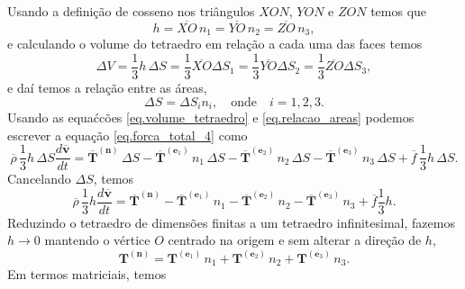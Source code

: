 Usando a defini\c{c}\~ao de cosseno nos tri\^angulos $XON$, $YON$ e $ZON$ temos que
\begin{equation*}
h=\overline{XO}\,n_1=\overline{YO}\,n_2=\overline{ZO}\,n_3,
\end{equation*}
e calculando o volume do tetraedro em rela\c{c}\~ao a cada uma das faces temos
\begin{equation}\label{eq.volume_tetraedro}
\Delta V=\frac{1}{3}h\,\Delta S=\frac{1}{3}\overline{XO}\Delta S_1=\frac{1}{3}\overline{YO}\Delta S_2=\frac{1}{3}\overline{ZO}\Delta S_3,
\end{equation}
e da\'i temos a rela\c{c}\~ao entre as \'areas,
\begin{equation}\label{eq.relacao_areas}
\Delta S=\Delta S_in_i,\quad\text{onde}\quad i=1,2,3.
\end{equation}
Usando as equa\'c{c}\~oes \ref{eq.volume_tetraedro} e \ref{eq.relacao_areas} podemos escrever a equa\c{c}\~ao \ref{eq.forca_total_4} como
\begin{equation*}
\overline{\rho}\,\frac{1}{3}h\,\Delta S\frac{d\overline{\mathbf{v}}}{dt}=\mathbf{\overline{T}}^{(\mathbf{n})}\,\Delta S-\mathbf{\overline{T}}^{(\mathbf{e}_1)}\,n_1\,\Delta S-\mathbf{\overline{T}}^{(\mathbf{e}_2)}\,n_2\,\Delta S-\mathbf{\overline{T}}^{(\mathbf{e}_3)}\,n_3\,\Delta S+\overline{f}\,\frac{1}{3}h\,\Delta S.
\end{equation*}
Cancelando $\Delta S$, temos
\begin{equation*}
\overline{\rho}\,\frac{1}{3}h\frac{d\overline{\mathbf{v}}}{dt}=\mathbf{\overline{T}}^{(\mathbf{n})}-\mathbf{\overline{T}}^{(\mathbf{e}_1)}\,n_1-\mathbf{\overline{T}}^{(\mathbf{e}_2)}\,n_2-\mathbf{\overline{T}}^{(\mathbf{e}_3)}\,n_3+\overline{f}\frac{1}{3}h.
\end{equation*}
Reduzindo o tetraedro de dimens\~oes finitas a um tetraedro infinitesimal, fazemos $h\to 0$ mantendo o v\'ertice $O$ centrado na origem e sem alterar a dire\c{c}\~ao de $h$,
\begin{equation*}
\mathbf{T}^{(\mathbf{n})}=\mathbf{T}^{(\mathbf{e}_1)}\,n_1+\mathbf{T}^{(\mathbf{e}_2)}\,n_2+\mathbf{T}^{(\mathbf{e}_3)}\,n_3.
\end{equation*}
Em termos matriciais, temos
